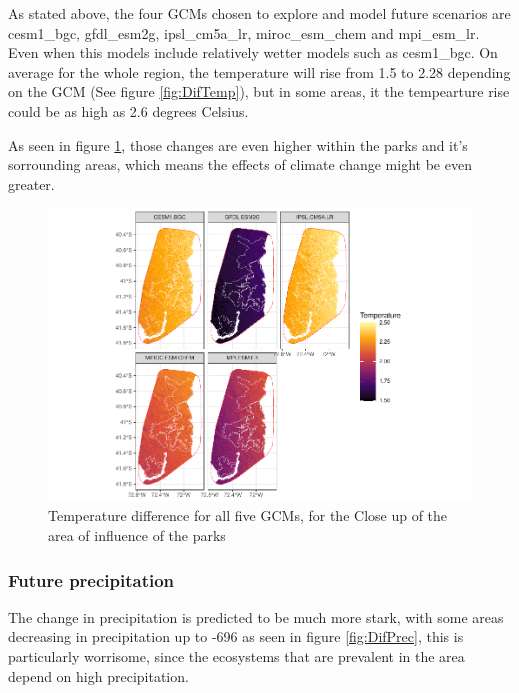 \documentclass[]{article}
\begin{document}
As stated above, the four GCMs chosen to explore and model future scenarios are cesm1\_bgc, gfdl\_esm2g, ipsl\_cm5a\_lr, miroc\_esm\_chem and mpi\_esm\_lr. Even when this models include relatively wetter models such as cesm1\_bgc. On average for the whole region, the temperature will rise from 1.5 to 2.28 depending on the GCM (See figure \ref{fig:DifTemp}), but in some areas, it the tempearture rise could be as high as 2.6 degrees Celsius.

As seen in figure \ref{fig:DifTempHull}, those changes are even higher within the parks and it's sorrounding areas, which means the effects of climate change might be even greater.

\begin{figure}
\centering
\includegraphics{Review_and_climate_files/figure-latex/DifTempHull-1.pdf}
\caption{\label{fig:DifTempHull}Temperature difference for all five GCMs, for the Close up of the area of influence of the parks}
\end{figure}

\hypertarget{future-precipitation}{%
\subsubsection{Future precipitation}\label{future-precipitation}}

The change in precipitation is predicted to be much more stark, with some areas decreasing in precipitation up to -696 as seen in figure \ref{fig:DifPrec}, this is particularly worrisome, since the ecosystems that are prevalent in the area depend on high precipitation.
\end{document}
